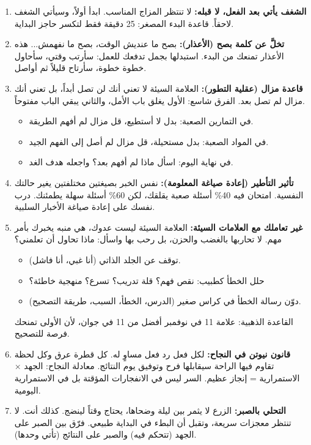 \documentclass[12pt,a4paper]{book}
\begin{document}
\begin{enumerate}
		\item \textbf{الشغف يأتي بعد الفعل، لا قبله:} لا تنتظر المزاج المناسب. ابدأ أولاً، وسيأتي الشغف لاحقاً. قاعدة البدء المصغر: 25 دقيقة فقط لتكسر حاجز البداية.
		
		\item \textbf{تخلَّ عن كلمة بصح (الأعذار):} بصح ما عنديش الوقت، بصح ما نفهمش... هذه الأعذار تمنعك من البدء. استبدلها بجمل تدفعك للعمل: سأرتب وقتي، سأحاول خطوة خطوة، سأرتاح قليلاً ثم أواصل.
		
		\item \textbf{قاعدة مزال (عقلية التطور):} العلامة السيئة لا تعني أنك لن تصل أبداً، بل تعني أنك مزال لم تصل بعد. الفرق شاسع: الأول يغلق باب الأمل، والثاني يبقي الباب مفتوحاً.
		\begin{itemize}
			\item في التمارين الصعبة: بدل لا أستطيع، قل مزال لم أفهم الطريقة.
			\item في المواد الصعبة: بدل مستحيلة، قل مزال لم أصل إلى الفهم الجيد.
			\item في نهاية اليوم: اسأل ماذا لم أفهم بعد؟ واجعله هدف الغد.
		\end{itemize}
		
		\item \textbf{تأثير التأطير (إعادة صياغة المعلومة):} نفس الخبر بصيغتين مختلفتين يغير حالتك النفسية. امتحان فيه 40\% أسئلة صعبة يقلقك، لكن 60\% أسئلة سهلة يطمئنك. درب نفسك على إعادة صياغة الأخبار السلبية.
		
		\item \textbf{غير تعاملك مع العلامات السيئة:} العلامة السيئة ليست عدوك، هي منبه يخبرك بأمر مهم. لا تحاربها بالغضب والحزن، بل رحب بها واسأل: ماذا تحاول أن تعلمني؟
		\begin{itemize}
			\item توقف عن الجلد الذاتي (أنا غبي، أنا فاشل).
			\item حلل الخطأ كطبيب: نقص فهم؟ قلة تدريب؟ تسرع؟ منهجية خاطئة؟
			\item دوّن رسالة الخطأ في كراس صغير (الدرس، الخطأ، السبب، طريقة التصحيح).
		\end{itemize}
		القاعدة الذهبية: علامة 11 في نوفمبر أفضل من 11 في جوان، لأن الأولى تمنحك فرصة للتصحيح.
		
		\item \textbf{قانون نيوتن في النجاح:} لكل فعل رد فعل مساوٍ له. كل قطرة عرق وكل لحظة تقاوم فيها الراحة سيقابلها فرح وتوفيق يوم النتائج. معادلة النجاح: الجهد × الاستمرارية = إنجاز عظيم. السر ليس في الانفجارات المؤقتة بل في الاستمرارية اليومية.
		
		\item \textbf{التحلي بالصبر:} الزرع لا يثمر بين ليلة وضحاها، يحتاج وقتاً لينضج. كذلك أنت. لا تنتظر معجزات سريعة، وتقبل أن البطء في البداية طبيعي. فرّق بين الصبر على الجهد (تتحكم فيه) والصبر على النتائج (تأتي وحدها).
		

\end{enumerate}
\end{document}
